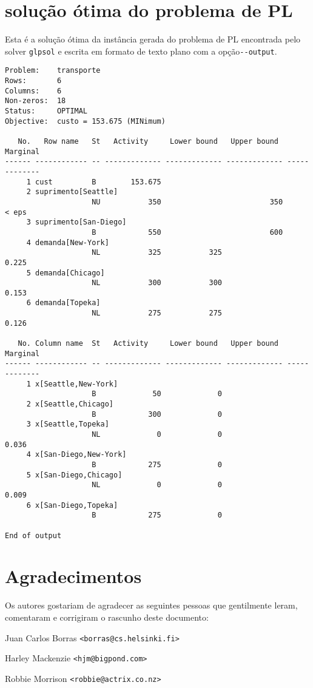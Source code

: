 \documentclass[11pt, brazil]{report}
\begin{document}
\section{solução ótima do problema de PL}

Esta é a solução ótima da instância gerada do problema de PL
encontrada pelo solver \verb|glpsol| e escrita em formato de texto plano
com a opção\verb|--output|.

\medskip

\begin{footnotesize}
\begin{verbatim}
Problem:    transporte
Rows:       6
Columns:    6
Non-zeros:  18
Status:     OPTIMAL
Objective:  custo = 153.675 (MINimum)

   No.   Row name   St   Activity     Lower bound   Upper bound    Marginal
------ ------------ -- ------------- ------------- ------------- -------------
     1 cust         B        153.675
     2 suprimento[Seattle]
                    NU           350                         350         < eps
     3 suprimento[San-Diego]
                    B            550                         600
     4 demanda[New-York]
                    NL           325           325                       0.225
     5 demanda[Chicago]
                    NL           300           300                       0.153
     6 demanda[Topeka]
                    NL           275           275                       0.126

   No. Column name  St   Activity     Lower bound   Upper bound    Marginal
------ ------------ -- ------------- ------------- ------------- -------------
     1 x[Seattle,New-York]
                    B             50             0
     2 x[Seattle,Chicago]
                    B            300             0
     3 x[Seattle,Topeka]
                    NL             0             0                       0.036
     4 x[San-Diego,New-York]
                    B            275             0
     5 x[San-Diego,Chicago]
                    NL             0             0                       0.009
     6 x[San-Diego,Topeka]
                    B            275             0

End of output
\end{verbatim}
\end{footnotesize}


\newpage

\section*{Agradecimentos}

Os autores gostariam de agradecer as seguintes pessoas que gentilmente leram,
comentaram e corrigiram o rascunho deste documento:

\noindent Juan Carlos Borras \verb|<borras@cs.helsinki.fi>|

\noindent Harley Mackenzie \verb|<hjm@bigpond.com>|

\noindent Robbie Morrison \verb|<robbie@actrix.co.nz>|
\end{document}
